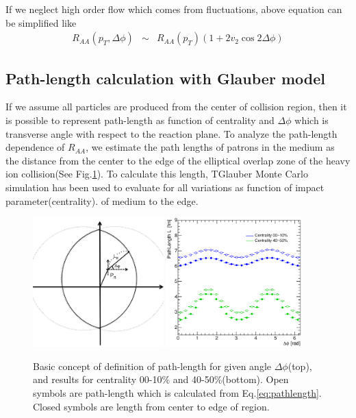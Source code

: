  If we neglect high order flow which comes from fluctuations, above equation can be simplified like 
   \begin{eqnarray}
  R_{AA}(p_{T}, \Delta \phi) &\sim& {R_{AA}(p_T)} (1+2 v_{2} \cos{2\Delta \phi})
  \end {eqnarray}
\bigskip

	\subsection{Path-length calculation with Glauber model}
	
  If we assume all particles are produced from the center of collision region, then it is possible to represent path-length as function of centrality and $\Delta\phi$ which is transverse angle with respect to the reaction plane. To analyze the path-length dependence of $R_{AA}$, we estimate the path lengths of patrons in the medium as the distance from  the center to the edge of the elliptical overlap zone of the heavy ion collision(See Fig.\ref{Fig1}). To calculate this length, TGlauber Monte Carlo simulation has been used to evaluate  for all variations as function of impact parameter(centrality). of medium to the edge.  
  
\begin{figure}[htbp]
\begin{center}
\includegraphics[height=5cm]{figures/Fig_pathlength/fig1.jpg}
\includegraphics[height=5cm]{figures/Fig_pathlength/fig2.eps}
\caption{Basic concept of definition of path-length for given angle $\Delta \phi$(top), and results for centrality 00-10\% and 40-50\%(bottom). Open symbols are path-length which is calculated from Eq.\ref{eq:pathlength}. Closed symbols are length from center to edge of region.}
\label{Fig1}
\end{center}
\end{figure}

